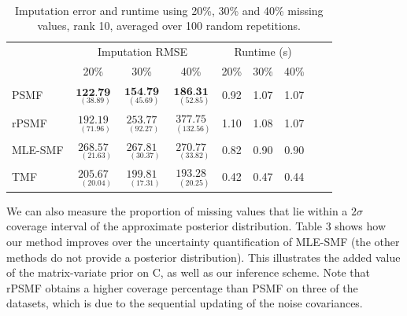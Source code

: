\documentclass{mldsmsc}
\begin{document}
\begin{table}[H]
\centering
\label{tab:rmse10}
 \\[0.5ex]
\begin{tabular}{@{}lccc|ccccc@{}}
\toprule
 & \multicolumn{3}{c}{Imputation RMSE} & \multicolumn{3}{c}{Runtime (s)} \\
 & 20\% & 30\% & 40\% & 20\% & 30\% & 40\% \\
\midrule
PSMF & $\underset{{\scriptscriptstyle \;\;(38.89)}}{\textbf{122.79}}$ & $\underset{{\scriptscriptstyle \;\;(45.69)}}{\textbf{154.79}}$ & $\underset{{\scriptscriptstyle \;\;\;(52.85)}}{\textbf{186.31}}$ & 0.92 & 1.07 & 1.07 \\
rPSMF & $\underset{{\scriptscriptstyle \;\;(71.96)}}{192.19}$ & $\underset{{\scriptscriptstyle \;\;(92.27)}}{253.77}$ & $\underset{{\scriptscriptstyle \;\;(132.56)}}{377.75}$ & 1.10 & 1.08 & 1.07\\
MLE-SMF & $\underset{{\scriptscriptstyle \;\;\;(21.63)}}{268.57}$ & $\underset{{\scriptscriptstyle \;\;\;(30.37)}}{267.81}$ & $\underset{{\scriptscriptstyle \;\;\;(33.82)}}{270.77}$ & 0.82 & 0.90 & 0.90 \\
TMF & $\underset{{\scriptscriptstyle \;\;\;(20.04)}}{205.67}$ & $\underset{{\scriptscriptstyle \;\;\;(17.31)}}{199.81}$ & $\underset{{\scriptscriptstyle \;\;\;(20.25)}}{193.28}$ & 0.42 & 0.47 & 0.44 \\
\bottomrule
\end{tabular}
\caption{Imputation error and runtime using 20\%, 30\% and 40\% missing values, rank 10, averaged over 100 random repetitions.}
\end{table}

\noindent We can also measure the proportion of missing values that lie within a $2\sigma$ coverage interval of the approximate posterior distribution. Table 3 shows how our method improves over the uncertainty quantification of MLE-SMF (the other methods do not provide a posterior distribution). This illustrates the added value of the matrix-variate prior on C, as well as our inference scheme. Note that rPSMF obtains a higher coverage percentage than PSMF on three of the datasets, which is due to the sequential updating of the noise covariances. \newline
\end{document}
